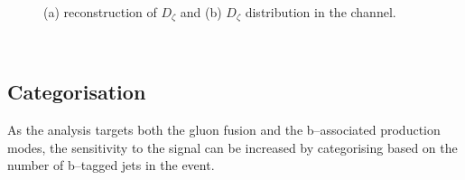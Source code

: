 \begin{figure}[h!]
\begin{center}
\end{center}
\caption[Reconstruction of the $D_{\zeta}$ variable and the $D_{\zeta}$ distribution
in the \emu channel.]{(a) reconstruction of $D_{\zeta}$ \cite{cdf-dzeta} and (b) $D_{\zeta}$ distribution in the 
\emu channel\cite{CMS-PAS-HIG-16-037}.}
\label{fig:mssm_dzeta}
\end{figure}
~\clearpage
\subsection{Categorisation}
\label{sec:mssm_eventsel_categories}
As the analysis targets both the gluon fusion
and the b--associated production modes, 
the sensitivity to the signal can be increased by categorising
based on the number of b--tagged jets in the event.

